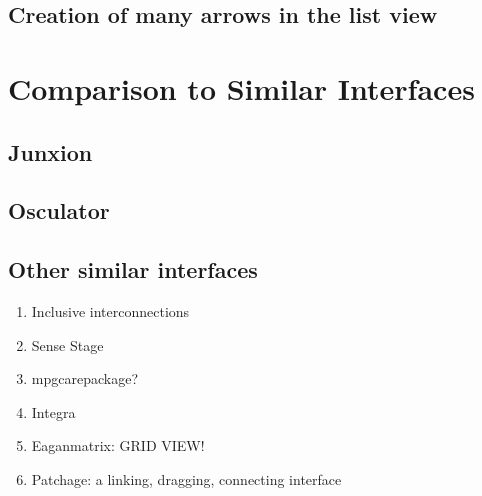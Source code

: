 
	\subsection{Creation of many arrows in the list view} %
	\label{sub:creation_of_many_arrows_in_the_list_view}
	


\section{Comparison to Similar Interfaces} %
\label{sec:comparison_to_similar_interfaces}

	\subsection{Junxion} %
	\label{sub:junxion}
		\cite{junxion}

	\subsection{Osculator} %
	\label{sub:osculator}
		\cite{osculator}

	\subsection{Other similar interfaces} %
	\label{sub:other_similar_interfaces}
	
	\begin{enumerate}
		\item Inclusive interconnections 
		\item Sense Stage 
		\item mpgcarepackage?
		\item Integra 
		\item Eaganmatrix: GRID VIEW! 
		\item Patchage: a linking, dragging, connecting interface 
	\end{enumerate}

